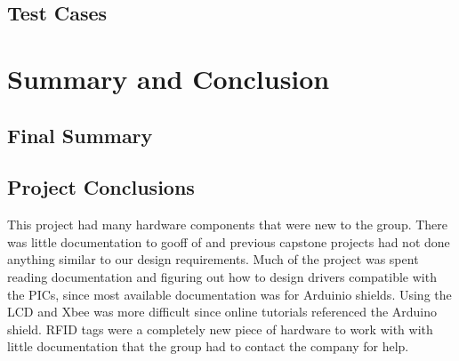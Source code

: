 \documentclass[12pt]{article} %
\begin{document}
\begin{itemize}
\subsection{Test Cases} %
%




\section{Summary and Conclusion}
%

\subsection{Final Summary}


\subsection{Project Conclusions} %

This project had many hardware components that were new to the group. There was little documentation to gooff of and previous capstone projects had not done anything similar to our design requirements. Much of the project was spent
reading documentation and figuring out how to design drivers compatible with the PICs, since most available documentation was
for Arduinio shields. Using the LCD and Xbee was more difficult since online tutorials referenced the Arduino shield. RFID tags
were a completely new piece of hardware to work with with little documentation that the group had to contact the company for help.


\end{itemize}
\end{document}
